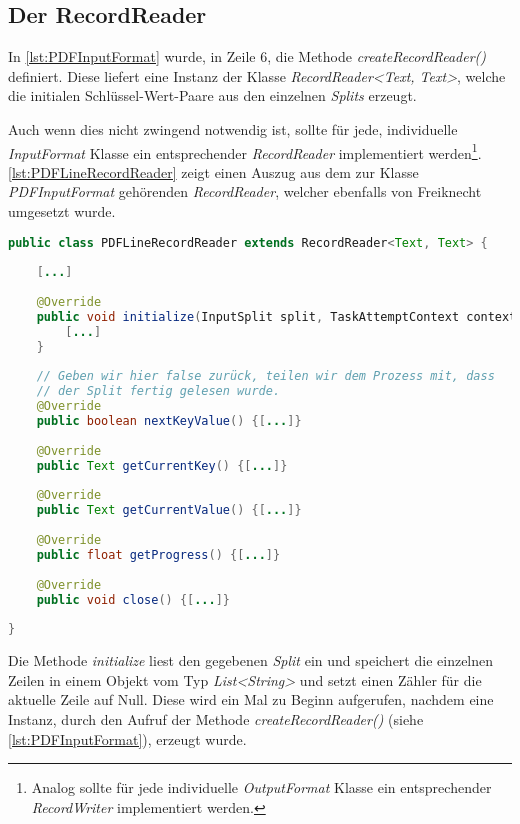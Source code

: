 \subsection{Der RecordReader}\label{subsec:RecordReader}
In \autoref{lst:PDFInputFormat} wurde, in Zeile 6, die Methode \textit{createRecordReader()} definiert. Diese liefert eine Instanz der Klasse \textit{RecordReader<Text, Text>}, welche die initialen Schlüssel-Wert-Paare aus den einzelnen \textit{Splits} erzeugt.

Auch wenn dies nicht zwingend notwendig ist, sollte für jede, individuelle \textit{InputFormat} Klasse ein entsprechender \textit{RecordReader} implementiert werden\footnote{Analog sollte für jede individuelle \textit{OutputFormat} Klasse ein entsprechender \textit{RecordWriter} implementiert werden.}. \autoref{lst:PDFLineRecordReader} zeigt einen Auszug aus dem zur Klasse \textit{PDFInputFormat} gehörenden \textit{RecordReader}, welcher ebenfalls von Freiknecht umgesetzt wurde. \\

\begin{lstlisting}[language=Java,caption=Auszug aus der Klasse \textit{PDFLineRecordReader},title=\autoref*{lst:PDFLineRecordReader}: Auszug aus der Klasse \textit{PDFLineRecordReader}\protect\footnotemark,label=lst:PDFLineRecordReader]
public class PDFLineRecordReader extends RecordReader<Text, Text> {
	
	[...]
	
	@Override
	public void initialize(InputSplit split, TaskAttemptContext context) {
		[...]
	}
	
	// Geben wir hier false zurück, teilen wir dem Prozess mit, dass
	// der Split fertig gelesen wurde.
	@Override
	public boolean nextKeyValue() {[...]}
	
	@Override
	public Text getCurrentKey() {[...]}
		
	@Override
	public Text getCurrentValue() {[...]}
			
	@Override
	public float getProgress() {[...]}
	
	@Override
	public void close() {[...]}
	
}
\end{lstlisting}

\newpage
Die Methode \textit{initialize} liest den gegebenen \textit{Split} ein und speichert die einzelnen Zeilen in einem Objekt vom Typ \textit{List<String>} und setzt einen Zähler für die aktuelle Zeile auf Null. Diese wird ein Mal zu Beginn aufgerufen, nachdem eine Instanz, durch den Aufruf der Methode \textit{createRecordReader()} (siehe \autoref{lst:PDFInputFormat}), erzeugt wurde.

